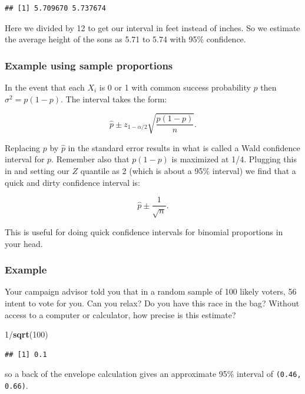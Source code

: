 \documentclass[]{article}
\newenvironment{Shaded}{\begin{snugshade}}{\end{snugshade}}
\newcommand{\KeywordTok}[1]{\textcolor[rgb]{0.13,0.29,0.53}{\textbf{{#1}}}}
\newcommand{\DecValTok}[1]{\textcolor[rgb]{0.00,0.00,0.81}{{#1}}}
\newcommand{\NormalTok}[1]{{#1}}
\begin{document}
\begin{verbatim}
## [1] 5.709670 5.737674
\end{verbatim}

Here we divided by 12 to get our interval in feet instead of inches. So
we estimate the average height of the sons as 5.71 to 5.74 with 95\%
confidence.

\subsubsection{Example using sample
proportions}\label{example-using-sample-proportions}

In the event that each $X_i$ is 0 or 1 with common success probability
$p$ then $\sigma^2 = p(1 - p)$. The interval takes the form:

\[
\hat p \pm z_{1 - \alpha/2}  \sqrt{\frac{p(1 - p)}{n}}.
\]

Replacing $p$ by $\hat p$ in the standard error results in what is
called a Wald confidence interval for $p$. Remember also that $p(1 - p)$
is maximized at 1/4. Plugging this in and setting our $Z$ quantile as 2
(which is about a 95\% interval) we find that a quick and dirty
confidence interval is:

\[\hat p \pm \frac{1}{\sqrt{n}}.\]

This is useful for doing quick confidence intervals for binomial
proportions in your head.

\subsubsection{Example}\label{example-15}

Your campaign advisor told you that in a random sample of 100 likely
voters, 56 intent to vote for you. Can you relax? Do you have this race
in the bag? Without access to a computer or calculator, how precise is
this estimate?

\begin{Shaded}
\begin{Highlighting}[]
\DecValTok{1}\NormalTok{/}\KeywordTok{sqrt}\NormalTok{(}\DecValTok{100}\NormalTok{)}
\end{Highlighting}
\end{Shaded}

\begin{verbatim}
## [1] 0.1
\end{verbatim}

so a back of the envelope calculation gives an approximate 95\% interval
of \texttt{(0.46, 0.66)}.
\end{document}
